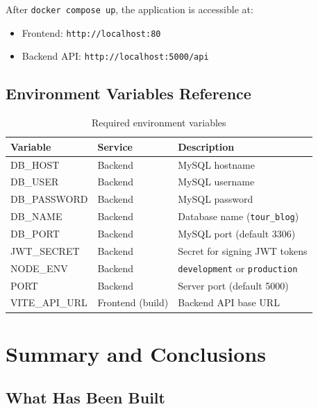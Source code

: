 \documentclass[12pt,a4paper]{report}
\begin{document}
After \texttt{docker compose up}, the application is accessible at:
\begin{itemize}[leftmargin=2em]
  \item Frontend: \texttt{http://localhost:80}
  \item Backend API: \texttt{http://localhost:5000/api}
\end{itemize}

\section{Environment Variables Reference}

\begin{table}[H]
  \centering
  \caption{Required environment variables}
  \begin{tabular}{lll}
    \toprule
    \textbf{Variable} & \textbf{Service} & \textbf{Description} \\
    \midrule
    DB\_HOST         & Backend & MySQL hostname \\
    DB\_USER         & Backend & MySQL username \\
    DB\_PASSWORD     & Backend & MySQL password \\
    DB\_NAME         & Backend & Database name (\texttt{tour\_blog}) \\
    DB\_PORT         & Backend & MySQL port (default 3306) \\
    JWT\_SECRET      & Backend & Secret for signing JWT tokens \\
    NODE\_ENV        & Backend & \texttt{development} or \texttt{production} \\
    PORT             & Backend & Server port (default 5000) \\
    VITE\_API\_URL   & Frontend (build) & Backend API base URL \\
    \bottomrule
  \end{tabular}
\end{table}

\chapter{Summary and Conclusions}

\section{What Has Been Built}
\end{document}
